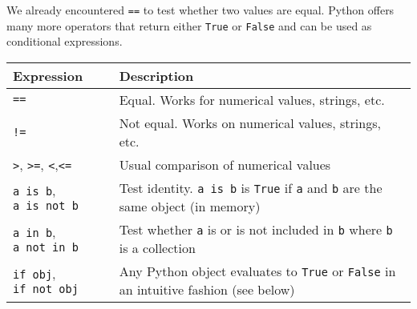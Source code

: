 \documentclass[10pt]{scrartcl}
\begin{document}
We already encountered \texttt{==} to test whether two values are equal.
Python offers many more operators that return either \texttt{True} or
\texttt{False} and can be used as conditional expressions.

\begin{longtable}[]{@{}ll@{}}
\toprule
\begin{minipage}[b]{0.51\columnwidth}\raggedright
Expression\strut
\end{minipage} & \begin{minipage}[b]{0.43\columnwidth}\raggedright
Description\strut
\end{minipage}\tabularnewline
\midrule
\endhead
\begin{minipage}[t]{0.51\columnwidth}\raggedright
\texttt{==}\strut
\end{minipage} & \begin{minipage}[t]{0.43\columnwidth}\raggedright
Equal. Works for numerical values, strings, etc.\strut
\end{minipage}\tabularnewline
\begin{minipage}[t]{0.51\columnwidth}\raggedright
\texttt{!=}\strut
\end{minipage} & \begin{minipage}[t]{0.43\columnwidth}\raggedright
Not equal. Works on numerical values, strings, etc.\strut
\end{minipage}\tabularnewline
\begin{minipage}[t]{0.51\columnwidth}\raggedright
\texttt{\textgreater{}}, \texttt{\textgreater{}=},
\texttt{\textless{}},\texttt{\textless{}=}\strut
\end{minipage} & \begin{minipage}[t]{0.43\columnwidth}\raggedright
Usual comparison of numerical values\strut
\end{minipage}\tabularnewline
\begin{minipage}[t]{0.51\columnwidth}\raggedright
\texttt{a\ is\ b}, \texttt{a\ is\ not\ b}\strut
\end{minipage} & \begin{minipage}[t]{0.43\columnwidth}\raggedright
Test identity. \texttt{a\ is\ b} is \texttt{True} if \texttt{a} and
\texttt{b} are the same object (in memory)\strut
\end{minipage}\tabularnewline
\begin{minipage}[t]{0.51\columnwidth}\raggedright
\texttt{a\ in\ b}, \texttt{a\ not\ in\ b}\strut
\end{minipage} & \begin{minipage}[t]{0.43\columnwidth}\raggedright
Test whether \texttt{a} is or is not included in \texttt{b} where
\texttt{b} is a collection\strut
\end{minipage}\tabularnewline
\begin{minipage}[t]{0.51\columnwidth}\raggedright
\texttt{if\ obj}, \texttt{if\ not\ obj}\strut
\end{minipage} & \begin{minipage}[t]{0.43\columnwidth}\raggedright
Any Python object evaluates to \texttt{True} or \texttt{False} in an
intuitive fashion (see below)\strut
\end{minipage}\tabularnewline
\bottomrule
\end{longtable}
\end{document}
